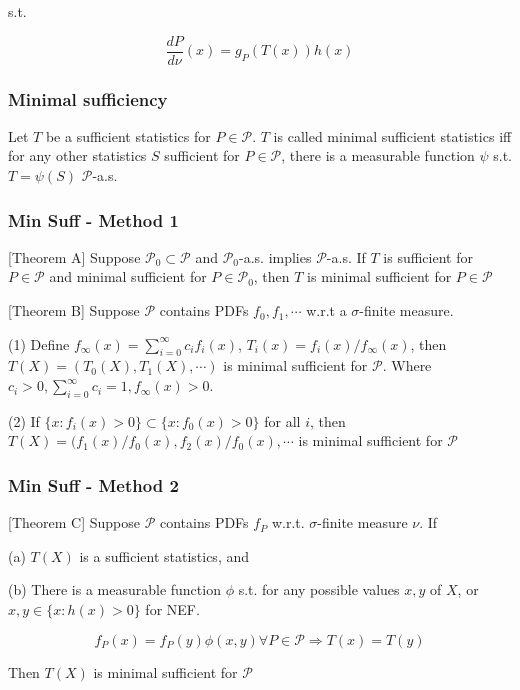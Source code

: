 s.t.

$$
\frac{dP}{d\nu}(x) = g_P(T(x))h(x)
$$

\subsubsection{Minimal sufficiency}

Let $T$ be a sufficient statistics for $P\in\mathcal{P}$. $T$ is called minimal sufficient statistics iff for any other statistics $S$ sufficient for $P\in\mathcal{P}$, there is a measurable function $\psi$ s.t. $T=\psi(S)$ $\mathcal{P}$-a.s.

\subsubsection{Min Suff - Method 1}

[Theorem A]
Suppose $\mathcal{P}_0\subset\mathcal{P}$ and $\mathcal{P}_0$-a.s. implies $\mathcal{P}$-a.s.
If $T$ is sufficient for $P\in\mathcal{P}$ and minimal sufficient for $P\in\mathcal{P}_0$, then $T$ is minimal sufficient for $P\in\mathcal{P}$

[Theorem B]
Suppose $\mathcal{P}$ contains PDFs $f_0, f_1, \cdots$ w.r.t a $\sigma$-finite measure.

(1) Define $f_\infty(x)=\sum_{i=0}^\infty c_if_i(x)$, $T_i(x)=f_i(x)/f_\infty(x)$, then $T(X)=(T_0(X), T_1(X), \cdots)$ is minimal sufficient for $\mathcal{P}$. Where $c_i>0, \sum_{i=0}^\infty c_i=1, f_{\infty}(x)>0$.

(2) If $\{x:f_i(x)>0\}\subset \{x: f_0(x) > 0\}$ for all $i$, then $T(X)=(f_1(x)/f_0(x), f_2(x)/f_0(x), \cdots$ is minimal sufficient for $\mathcal{P}$

\subsubsection{Min Suff - Method 2}

[Theorem C]
Suppose $\mathcal{P}$ contains PDFs $f_P$ w.r.t. $\sigma$-finite measure $\nu$. If

(a) $T(X)$ is a sufficient statistics, and

(b) There is a measurable function $\phi$ s.t. for any possible values $x, y$ of $X$, or $x, y\in\{x:h(x)>0\}$ for NEF.

$$
f_P(x) = f_P(y)\phi(x, y) \forall P\in\mathcal{P} \Rightarrow T(x)=T(y)
$$

Then $T(X)$ is minimal sufficient for $\mathcal{P}$

